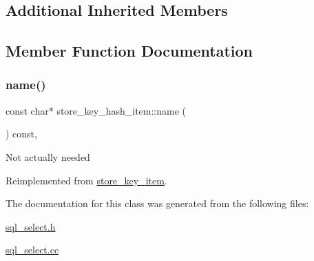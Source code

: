 \subsection*{Additional Inherited Members}


\subsection{Member Function Documentation}
\mbox{\label{classstore__key__hash__item_a213002a48540add6652dfc3d908ee367}} 
\subsubsection{\texorpdfstring{name()}{name()}}
{\footnotesize\ttfamily const char$\ast$ store\+\_\+key\+\_\+hash\+\_\+item\+::name (\begin{DoxyParamCaption}{ }\end{DoxyParamCaption}) const\hspace{0.3cm}{\ttfamily [inline]}, {\ttfamily [virtual]}}

Not actually needed 

Reimplemented from \mbox{\hyperlink{classstore__key__item_a88e2baa208896dcde9ba66e9715efc3c}{store\+\_\+key\+\_\+item}}.



The documentation for this class was generated from the following files\+:\begin{DoxyCompactItemize}
\item 
\mbox{\hyperlink{sql__select_8h}{sql\+\_\+select.\+h}}\item 
\mbox{\hyperlink{sql__select_8cc}{sql\+\_\+select.\+cc}}\end{DoxyCompactItemize}
